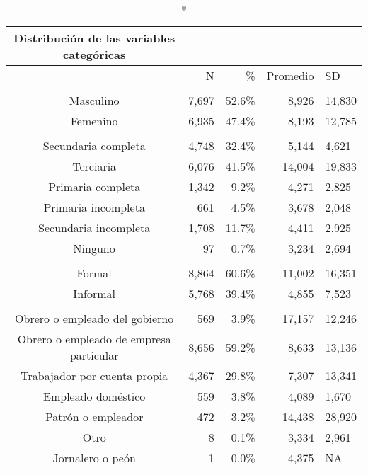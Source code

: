 \centering \footnotesize \setlength{\tabcolsep}{4pt} \renewcommand{\arraystretch}{0.8}
\begingroup
\fontsize{7.0pt}{8.5pt}\selectfont
\begin{longtable}{crrrl}
\caption*{
{\large Distribución de las variables categóricas}
} \\ 
\toprule
  & N & \% & Promedio & SD \\ 
\midrule\addlinespace[2.5pt]
\multicolumn{5}{l}{{\bfseries Sexo}} \\[2.5pt] 
\midrule\addlinespace[2.5pt]
Masculino & 7,697 & 52.6\% & 8,926 & 14,830 \\ 
Femenino & 6,935 & 47.4\% & 8,193 & 12,785 \\ 
\midrule\addlinespace[2.5pt]
\multicolumn{5}{l}{{\bfseries Máximo nivel educativo}} \\[2.5pt] 
\midrule\addlinespace[2.5pt]
Secundaria completa & 4,748 & 32.4\% &  5,144 &  4,621 \\ 
Terciaria & 6,076 & 41.5\% & 14,004 & 19,833 \\ 
Primaria completa & 1,342 &  9.2\% &  4,271 &  2,825 \\ 
Primaria incompleta &   661 &  4.5\% &  3,678 &  2,048 \\ 
Secundaria incompleta & 1,708 & 11.7\% &  4,411 &  2,925 \\ 
Ninguno &    97 &  0.7\% &  3,234 &  2,694 \\ 
\midrule\addlinespace[2.5pt]
\multicolumn{5}{l}{{\bfseries Formalidad}} \\[2.5pt] 
\midrule\addlinespace[2.5pt]
Formal & 8,864 & 60.6\% & 11,002 & 16,351 \\ 
Informal & 5,768 & 39.4\% &  4,855 &  7,523 \\ 
\midrule\addlinespace[2.5pt]
\multicolumn{5}{l}{{\bfseries Posición ocupacional}} \\[2.5pt] 
\midrule\addlinespace[2.5pt]
Obrero o empleado del gobierno &   569 &  3.9\% & 17,157 & 12,246 \\ 
Obrero o empleado de empresa particular & 8,656 & 59.2\% &  8,633 & 13,136 \\ 
Trabajador por cuenta propia & 4,367 & 29.8\% &  7,307 & 13,341 \\ 
Empleado doméstico &   559 &  3.8\% &  4,089 &  1,670 \\ 
Patrón o empleador &   472 &  3.2\% & 14,438 & 28,920 \\ 
Otro &     8 &  0.1\% &  3,334 &  2,961 \\ 
Jornalero o peón &     1 &  0.0\% &  4,375 &     NA \\ 

\end{longtable}
